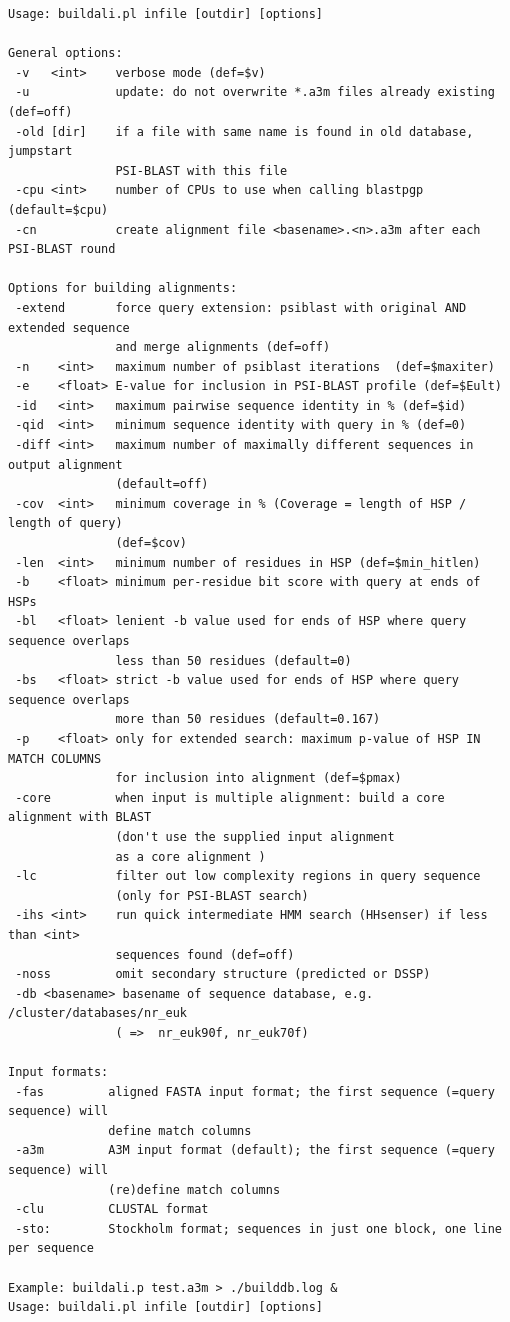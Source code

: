 \documentclass[11pt,a4paper]{article}
\begin{document}
\small \begin{verbatim}
Usage: buildali.pl infile [outdir] [options] 

General options:
 -v   <int>    verbose mode (def=$v)
 -u            update: do not overwrite *.a3m files already existing (def=off)
 -old [dir]    if a file with same name is found in old database, jumpstart 
               PSI-BLAST with this file
 -cpu <int>    number of CPUs to use when calling blastpgp (default=$cpu)
 -cn           create alignment file <basename>.<n>.a3m after each PSI-BLAST round

Options for building alignments:
 -extend       force query extension: psiblast with original AND extended sequence 
               and merge alignments (def=off)
 -n    <int>   maximum number of psiblast iterations  (def=$maxiter)
 -e    <float> E-value for inclusion in PSI-BLAST profile (def=$Eult)
 -id   <int>   maximum pairwise sequence identity in % (def=$id)
 -qid  <int>   minimum sequence identity with query in % (def=0)
 -diff <int>   maximum number of maximally different sequences in output alignment 
               (default=off) 
 -cov  <int>   minimum coverage in % (Coverage = length of HSP / length of query) 
               (def=$cov)
 -len  <int>   minimum number of residues in HSP (def=$min_hitlen)
 -b    <float> minimum per-residue bit score with query at ends of HSPs
 -bl   <float> lenient -b value used for ends of HSP where query sequence overlaps 
               less than 50 residues (default=0)
 -bs   <float> strict -b value used for ends of HSP where query sequence overlaps 
               more than 50 residues (default=0.167)
 -p    <float> only for extended search: maximum p-value of HSP IN MATCH COLUMNS 
               for inclusion into alignment (def=$pmax)
 -core         when input is multiple alignment: build a core alignment with BLAST 
               (don't use the supplied input alignment
               as a core alignment )
 -lc           filter out low complexity regions in query sequence 
               (only for PSI-BLAST search)
 -ihs <int>    run quick intermediate HMM search (HHsenser) if less than <int> 
               sequences found (def=off)
 -noss         omit secondary structure (predicted or DSSP)
 -db <basename> basename of sequence database, e.g. /cluster/databases/nr_euk  
               ( =>  nr_euk90f, nr_euk70f)

Input formats:
 -fas         aligned FASTA input format; the first sequence (=query sequence) will 
              define match columns
 -a3m         A3M input format (default); the first sequence (=query sequence) will 
              (re)define match columns
 -clu         CLUSTAL format
 -sto:        Stockholm format; sequences in just one block, one line per sequence
  
Example: buildali.p test.a3m > ./builddb.log &
Usage: buildali.pl infile [outdir] [options] 
\end{verbatim} \normalsize
\end{document}
